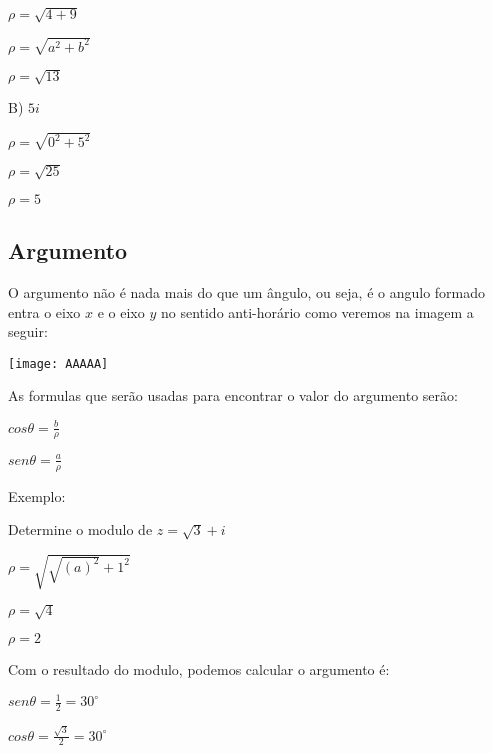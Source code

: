 \documentclass[]{article}
\begin{document}
\begin{large}
\begin{flushleft}
\begin{center}
$\rho=\sqrt{4+9}$

$\rho=\sqrt{a^2+b^2}$  

$\rho=\sqrt{13}$ \vspace{.3cm}

\end{center}
B) $5i$ \vspace{.2cm}
\begin{center}
$\rho=\sqrt{0^2+5^2}$  

$\rho=\sqrt{25}$  

$\rho= 5$ \vspace{.3cm}
\end{center}
\subsection{Argumento}

O argumento não é nada mais do que um ângulo, ou seja, é o angulo formado entra o eixo $x$ e o eixo $y$ no sentido anti-horário como veremos na imagem a seguir:

\texttt{[image: AAAAA]} \vspace{.3cm}

As formulas que serão usadas para encontrar o valor do argumento serão: \vspace{.3cm}

\begin{center}
    $cos\theta = \frac{b}{\rho}$
\end{center}

\begin{center}
    $sen\theta = \frac{a}{\rho}$
\end{center}

Exemplo: \vspace{.3cm}

Determine o modulo de $z=\sqrt{3}+i$
\begin{center}
    $\rho=\sqrt{\sqrt{(a)^2}+1^2}$
    
    $\rho=\sqrt{4}$
    
    $\rho=2$
    
\end{center}

Com o resultado do modulo, podemos calcular o argumento é: \vspace{.3cm}

\begin{center}
    $sen\theta=\frac{1}{2}=30^{\circ}$
\end{center}

\begin{center}
    $cos\theta=\frac{\sqrt{3}}{2}=30^{\circ}$
\end{center}


\end{flushleft}
\end{large}
\end{document}
